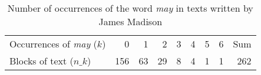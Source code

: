 \begin{table}[htb]
\centering
\caption{Number of occurrences of the word \emph{may} in texts written by James Madison\label{tab:fedtab}} 
\begin{tabular}{l|rrrrrrrr}
   \hline
Occurrences of \emph{may} ($k$) & 0 & 1 & 2 & 3 & 4 & 5 & 6 & Sum \\ 
  Blocks of text ($n\_k$)       & 156 &  63 &  29 &   8 &   4 &   1 &   1 & 262 \\ 
   \hline
\end{tabular}
\end{table}
